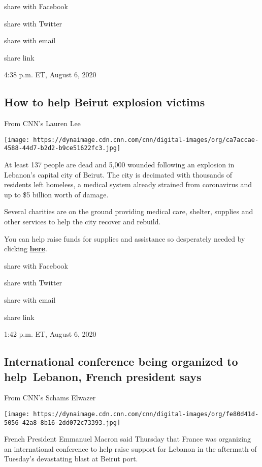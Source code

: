 share with Facebook

share with Twitter

share with email

share link

4:38 p.m. ET, August 6, 2020

\hypertarget{how-to-help-beirut-explosion-victims}{%
\subsection{How to help Beirut explosion
victims}\label{how-to-help-beirut-explosion-victims}}

From CNN's Lauren Lee

\texttt{[image: https://dynaimage.cdn.cnn.com/cnn/digital-images/org/ca7accae-4588-44d7-b2d2-b9ce51622fc3.jpg]}

At least 137 people are dead and 5,000 wounded following an explosion in
Lebanon's capital city of Beirut. The city is decimated with thousands
of residents left homeless, a medical system already strained from
coronavirus and up to \$5 billion worth of damage.

Several charities are on the ground providing medical care, shelter,
supplies and other services to help the city recover and rebuild.

You can help raise funds for supplies and assistance so desperately
needed by clicking
\href{https://impact.publicgood.com/campaign/e20043c4-fbac-4b26-bc1f-2cae69337391}{\textbf{here}}.

share with Facebook

share with Twitter

share with email

share link

1:42 p.m. ET, August 6, 2020

\hypertarget{international-conference-being-organized-to-help-lebanon-french-president-says}{%
\subsection{International conference being organized to help~Lebanon,
French president
says}\label{international-conference-being-organized-to-help-lebanon-french-president-says}}

From CNN's Schams Elwazer

\texttt{[image: https://dynaimage.cdn.cnn.com/cnn/digital-images/org/fe80d41d-5056-42a8-8b16-2dd072c73393.jpg]}

French President Emmanuel Macron said Thursday that France was
organizing an international conference to help raise support for Lebanon
in the aftermath of Tuesday's devastating blast at Beirut port.

